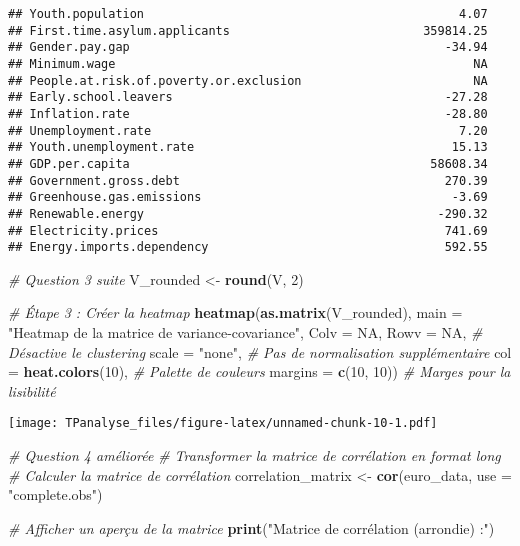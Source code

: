 \documentclass[
]{article}
\newenvironment{Shaded}{\begin{snugshade}}{\end{snugshade}}
\newcommand{\AttributeTok}[1]{\textcolor[rgb]{0.13,0.29,0.53}{#1}}
\newcommand{\CommentTok}[1]{\textcolor[rgb]{0.56,0.35,0.01}{\textit{#1}}}
\newcommand{\ConstantTok}[1]{\textcolor[rgb]{0.56,0.35,0.01}{#1}}
\newcommand{\DecValTok}[1]{\textcolor[rgb]{0.00,0.00,0.81}{#1}}
\newcommand{\FunctionTok}[1]{\textcolor[rgb]{0.13,0.29,0.53}{\textbf{#1}}}
\newcommand{\NormalTok}[1]{#1}
\newcommand{\OtherTok}[1]{\textcolor[rgb]{0.56,0.35,0.01}{#1}}
\newcommand{\StringTok}[1]{\textcolor[rgb]{0.31,0.60,0.02}{#1}}
\begin{document}
\begin{verbatim}
## Youth.population                                            4.07
## First.time.asylum.applicants                           359814.25
## Gender.pay.gap                                            -34.94
## Minimum.wage                                                  NA
## People.at.risk.of.poverty.or.exclusion                        NA
## Early.school.leavers                                      -27.28
## Inflation.rate                                            -28.80
## Unemployment.rate                                           7.20
## Youth.unemployment.rate                                    15.13
## GDP.per.capita                                          58608.34
## Government.gross.debt                                     270.39
## Greenhouse.gas.emissions                                   -3.69
## Renewable.energy                                         -290.32
## Electricity.prices                                        741.69
## Energy.imports.dependency                                 592.55
\end{verbatim}

\begin{Shaded}
\begin{Highlighting}[]
\CommentTok{\#  Question 3 suite }
\NormalTok{V\_rounded }\OtherTok{\textless{}{-}} \FunctionTok{round}\NormalTok{(V, }\DecValTok{2}\NormalTok{)}

\CommentTok{\# Étape 3 : Créer la heatmap}
\FunctionTok{heatmap}\NormalTok{(}\FunctionTok{as.matrix}\NormalTok{(V\_rounded), }
        \AttributeTok{main =} \StringTok{"Heatmap de la matrice de variance{-}covariance"}\NormalTok{,}
        \AttributeTok{Colv =} \ConstantTok{NA}\NormalTok{, }\AttributeTok{Rowv =} \ConstantTok{NA}\NormalTok{,  }\CommentTok{\# Désactive le clustering}
        \AttributeTok{scale =} \StringTok{"none"}\NormalTok{,  }\CommentTok{\# Pas de normalisation supplémentaire}
        \AttributeTok{col =} \FunctionTok{heat.colors}\NormalTok{(}\DecValTok{10}\NormalTok{),  }\CommentTok{\# Palette de couleurs}
        \AttributeTok{margins =} \FunctionTok{c}\NormalTok{(}\DecValTok{10}\NormalTok{, }\DecValTok{10}\NormalTok{))  }\CommentTok{\# Marges pour la lisibilité}
\end{Highlighting}
\end{Shaded}

\texttt{[image: TPanalyse\_files/figure-latex/unnamed-chunk-10-1.pdf]}

\begin{Shaded}
\begin{Highlighting}[]
\CommentTok{\# Question 4 améliorée }
\CommentTok{\# Transformer la matrice de corrélation en format long}
\CommentTok{\# Calculer la matrice de corrélation}
\NormalTok{correlation\_matrix }\OtherTok{\textless{}{-}} \FunctionTok{cor}\NormalTok{(euro\_data, }\AttributeTok{use =} \StringTok{"complete.obs"}\NormalTok{)}

\CommentTok{\# Afficher un aperçu de la matrice}
\FunctionTok{print}\NormalTok{(}\StringTok{"Matrice de corrélation (arrondie) :"}\NormalTok{)}
\end{Highlighting}
\end{Shaded}
\end{document}
